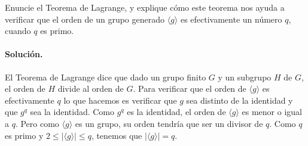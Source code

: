 Enuncie el Teorema de Lagrange, y explique cómo este teorema nos ayuda
a verificar que el orden de un grupo generado $\langle g\rangle$ es
efectivamente un número $q$, cuando $q$ es primo.

\paragraph{Solución.} El Teorema de Lagrange dice que dado un grupo finito $G$ y un subgrupo $H$ de $G$, el orden de $H$ divide al orden de $G$. Para verificar que el orden de $\langle g\rangle$ es efectivamente $q$ lo que hacemos es verificar que $g$ sea distinto de la identidad y que $g^q$ sea la identidad. Como $g^q$ es la identidad, el orden de $\langle g\rangle$ es menor o igual a $q$. Pero como $\langle g\rangle$ es un grupo, su orden tendría que ser un divisor de $q$. Como $q$ es primo y $2\leq |\langle g\rangle|\leq q$, tenemos que $|\langle g\rangle|=q$.
